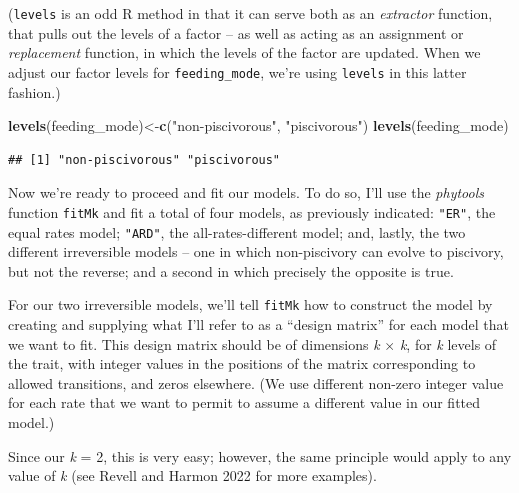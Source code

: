 \documentclass[fleqn,10pt,lineno]{wlpeerj} %
\newenvironment{Shaded}{\begin{snugshade}}{\end{snugshade}}
\newcommand{\FunctionTok}[1]{\textcolor[rgb]{0.13,0.29,0.53}{\textbf{#1}}}
\newcommand{\NormalTok}[1]{#1}
\newcommand{\OtherTok}[1]{\textcolor[rgb]{0.56,0.35,0.01}{#1}}
\newcommand{\StringTok}[1]{\textcolor[rgb]{0.31,0.60,0.02}{#1}}
\begin{document}
(\texttt{levels} is an odd R method in that it can serve both as an \emph{extractor} function, that pulls out the levels of a factor -- as well as acting as an assignment or \emph{replacement} function, in which the levels of the factor are updated. When we adjust our factor levels for \texttt{feeding\_mode}, we're using \texttt{levels} in this latter fashion.)

\begin{Shaded}
\begin{Highlighting}[]
\FunctionTok{levels}\NormalTok{(feeding\_mode)}\OtherTok{\textless{}{-}}\FunctionTok{c}\NormalTok{(}\StringTok{"non{-}piscivorous"}\NormalTok{,}
  \StringTok{"piscivorous"}\NormalTok{)}
\FunctionTok{levels}\NormalTok{(feeding\_mode)}
\end{Highlighting}
\end{Shaded}

\begin{verbatim}
## [1] "non-piscivorous" "piscivorous"
\end{verbatim}

Now we're ready to proceed and fit our models. To do so, I'll use the \emph{phytools} function \texttt{fitMk} and fit a total of four models, as previously indicated: \texttt{"ER"}, the equal rates model; \texttt{"ARD"}, the all-rates-different model; and, lastly, the two different irreversible models -- one in which non-piscivory can evolve to piscivory, but not the reverse; and a second in which precisely the opposite is true.

For our two irreversible models, we'll tell \texttt{fitMk} how to construct the model by creating and supplying what I'll refer to as a ``design matrix'' for each model that we want to fit. This design matrix should be of dimensions \emph{k} \(\times\) \emph{k}, for \emph{k} levels of the trait, with integer values in the positions of the matrix corresponding to allowed transitions, and zeros elsewhere. (We use different non-zero integer value for each rate that we want to permit to assume a different value in our fitted model.)

Since our \emph{k} = 2, this is very easy; however, the same principle would apply to any value of \emph{k} (see Revell and Harmon 2022 for more examples).
\end{document}
